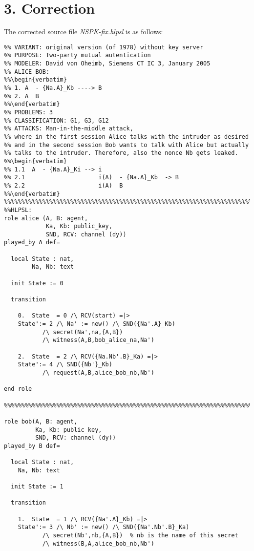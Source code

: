 \documentclass[a4paper, 12pt]{report}
\begin{document}
    \section*{3. Correction}
        The corrected source file \emph{NSPK-fix.hlpsl} is as follows:
        \begin{lstlisting}[frame=single]
%% PROTOCOL: NSPK: Needham-Schroeder Public-Key Protocol
%% VARIANT: original version (of 1978) without key server
%% PURPOSE: Two-party mutual autentication
%% MODELER: David von Oheimb, Siemens CT IC 3, January 2005
%% ALICE_BOB:
%%\begin{verbatim}
%% 1. A  - {Na.A}_Kb ----> B
%% 2. A  B
%%\end{verbatim}
%% PROBLEMS: 3
%% CLASSIFICATION: G1, G3, G12
%% ATTACKS: Man-in-the-middle attack,
%% where in the first session Alice talks with the intruder as desired
%% and in the second session Bob wants to talk with Alice but actually
%% talks to the intruder. Therefore, also the nonce Nb gets leaked.
%%\begin{verbatim}
%% 1.1  A  - {Na.A}_Ki --> i   	
%% 2.1                     i(A)  - {Na.A}_Kb  -> B   	
%% 2.2                     i(A)  B
%%\end{verbatim}
%%%%%%%%%%%%%%%%%%%%%%%%%%%%%%%%%%%%%%%%%%%%%%%%%%%%%%%%%%%%%%%%%%%%%%%%
%%HLPSL:
role alice (A, B: agent,             
            Ka, Kb: public_key,      
            SND, RCV: channel (dy)) 
played_by A def=

  local State : nat, 
        Na, Nb: text

  init State := 0

  transition  
   
    0.  State  = 0 /\ RCV(start) =|> 
	State':= 2 /\ Na' := new() /\ SND({Na'.A}_Kb)
		   /\ secret(Na',na,{A,B}) 
		   /\ witness(A,B,bob_alice_na,Na')

    2.  State  = 2 /\ RCV({Na.Nb'.B}_Ka) =|> 
	State':= 4 /\ SND({Nb'}_Kb) 
		   /\ request(A,B,alice_bob_nb,Nb')

end role

%%%%%%%%%%%%%%%%%%%%%%%%%%%%%%%%%%%%%%%%%%%%%%%%%%%%%%%%%%%%%%%%%%%%%%%%

role bob(A, B: agent,      
         Ka, Kb: public_key,      
         SND, RCV: channel (dy)) 
played_by B def=

  local State : nat, 
	Na, Nb: text

  init State := 1

  transition 

    1.  State  = 1 /\ RCV({Na'.A}_Kb) =|> 
	State':= 3 /\ Nb' := new() /\ SND({Na'.Nb'.B}_Ka)
		   /\ secret(Nb',nb,{A,B})  % nb is the name of this secret
		   /\ witness(B,A,alice_bob_nb,Nb')


\end{lstlisting}
\end{document}
